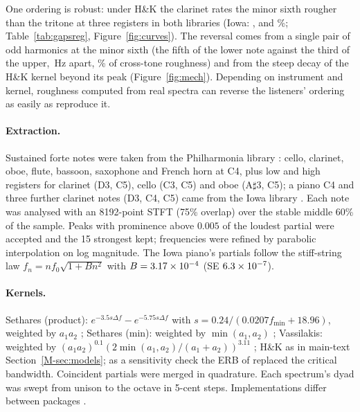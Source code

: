 \documentclass[11pt,a4paper]{article}
\newcommand{\sh}{\ensuremath{\sharp}}
\newcommand{\HK}{H\&K}
\begin{document}
One ordering is robust: under \HK{} the clarinet rates the minor sixth rougher than the tritone
at three registers in both libraries (Iowa: \iowaHKDThree, \iowaHKCFour{} and \iowaHKCFive\%;
Table~\ref{tab:gapsreg}, Figure~\ref{fig:curves}). The reversal comes from a single pair of odd
harmonics at the minor sixth (the fifth of the lower note against the third of the upper,
\mechHKpairBeat\,Hz apart, \mechHKpairShare\% of cross-tone roughness) and from the steep decay
of the \HK{} kernel beyond its peak (Figure~\ref{fig:mech}). Depending on instrument and kernel,
roughness computed from real spectra can reverse the listeners' ordering as easily as
reproduce it.

\paragraph{Extraction.}
Sustained forte notes were taken from the Philharmonia library \citep{philharmonia}: cello,
clarinet, oboe, flute, bassoon, saxophone and French horn at C4, plus low and high registers
for clarinet (D3, C5), cello (C3, C5) and oboe (A\sh3, C5); a piano C4 and three further
clarinet notes (D3, C4, C5) came from the Iowa library \citep{iowamis}. Each note was analysed
with an 8192-point STFT (75\% overlap) over the stable middle 60\% of the sample. Peaks with
prominence above $0.005$ of the loudest partial were accepted and the 15 strongest kept;
frequencies were refined by parabolic interpolation on log magnitude. The Iowa piano's
partials follow the stiff-string law $f_n=nf_0\sqrt{1+Bn^2}$ \citep{fletcher1964} with
$B=3.17\times10^{-4}$ (SE $6.3\times10^{-7}$).

\paragraph{Kernels.}
Sethares (product): $e^{-3.5s\Delta f}-e^{-5.75s\Delta f}$ with
$s=0.24/(0.0207f_{\min}+18.96)$, weighted by $a_1a_2$ \citep{sethares1993,sethmatlab};
Sethares (min): weighted by $\min(a_1,a_2)$ \citep{sethares2005}; Vassilakis: weighted by
$(a_1a_2)^{0.1}(2\min(a_1,a_2)/(a_1+a_2))^{3.11}$ \citep{vassilakis2001}; \HK{} as in main-text
Section~\ref{M-sec:models}; as a sensitivity check the ERB of \citet{glasberg1990} replaced
the critical bandwidth. Coincident partials were merged in
quadrature. Each spectrum's dyad was swept from unison to the octave in 5-cent steps.
Implementations differ between packages \citep{mashinter2006}.
\end{document}
